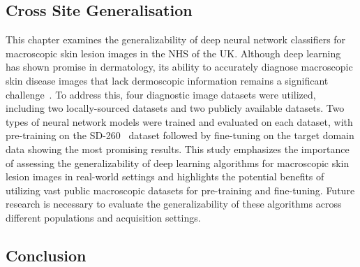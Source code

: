 \subsection*{Cross Site Generalisation}
This chapter examines the generalizability of deep neural network classifiers for macroscopic skin lesion images in the NHS of the UK. Although deep learning has shown promise in dermatology, its ability to accurately diagnose macroscopic skin disease images that lack dermoscopic information remains a significant challenge~\citep{jones2022artificial}. To address this, four diagnostic image datasets were utilized, including two locally-sourced datasets and two publicly available datasets. Two types of neural network models were trained and evaluated on each dataset, with pre-training on the SD-260~\citep{yang2019self} dataset followed by fine-tuning on the target domain data showing the most promising results. This study emphasizes the importance of assessing the generalizability of deep learning algorithms for macroscopic skin lesion images in real-world settings and highlights the potential benefits of utilizing vast public macroscopic datasets for pre-training and fine-tuning. Future research is necessary to evaluate the generalizability of these algorithms across different populations and acquisition settings.

\subsection*{Conclusion}
